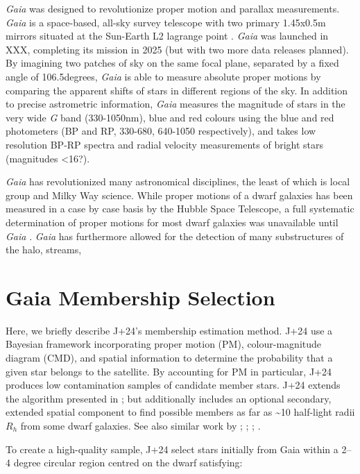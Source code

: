 \emph{Gaia} was designed to revolutionize proper motion and parallax
measurements. \emph{Gaia} is a space-based, all-sky survey telescope
with two primary 1.45x0.5m mirrors situated at the Sun-Earth L2 lagrange
point \citep{gaiacollaboration+2016}. \emph{Gaia} was launched in XXX,
completing its mission in 2025 (but with two more data releases
planned). By imagining two patches of sky on the same focal plane,
separated by a fixed angle of 106.5degrees, \emph{Gaia} is able to
measure absolute proper motions by comparing the apparent shifts of
stars in different regions of the sky. In addition to precise
astrometric information, \emph{Gaia} measures the magnitude of stars in
the very wide \emph{G} band (330-1050nm), blue and red colours using the
blue and red photometers (BP and RP, 330-680, 640-1050 respectively),
and takes low resolution BP-RP spectra and radial velocity measurements
of bright stars (magnitudes \textless16?).

\emph{Gaia} has revolutionized many astronomical disciplines, the least
of which is local group and Milky Way science. While proper motions of a
dwarf galaxies has been measured in a case by case basis by the Hubble
Space Telescope, a full systematic determination of proper motions for
most dwarf galaxies was unavailable until \emph{Gaia}
\citep{MV2020a, battaglia+2022}. \emph{Gaia} has furthermore allowed for
the detection of many substructures of the halo, streams,

\section{Gaia Membership Selection}\label{gaia-membership-selection}

Here, we briefly describe J+24's membership estimation method. J+24 use
a Bayesian framework incorporating proper motion (PM), colour-magnitude
diagram (CMD), and spatial information to determine the probability that
a given star belongs to the satellite. By accounting for PM in
particular, J+24 produces low contamination samples of candidate member
stars. J+24 extends the algorithm presented in \citet{MV2020a};
\citet{MV2020b} but additionally includes an optional secondary,
extended spatial component to find possible members as far as
\textasciitilde10 half-light radii \(R_h\) from some dwarf galaxies. See
also similar work by \citet{pace+li2019}; \citet{battaglia+2022};
\citet{pace+erkal+li2022}; \citet{qi+2022}.

To create a high-quality sample, J+24 select stars initially from Gaia
within a 2--4 degree circular region centred on the dwarf satisfying:

